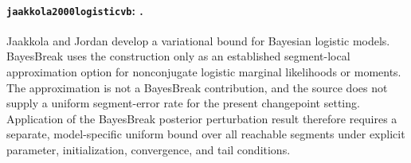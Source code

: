 \paragraph{\texttt{jaakkola2000logisticvb}: \citet{jaakkola2000logisticvb}.}
Jaakkola and Jordan develop a variational bound for Bayesian logistic models. BayesBreak uses the construction only as an established segment-local approximation option for nonconjugate logistic marginal likelihoods or moments. The approximation is not a BayesBreak contribution, and the source does not supply a uniform segment-error rate for the present changepoint setting. Application of the BayesBreak posterior perturbation result therefore requires a separate, model-specific uniform bound over all reachable segments under explicit parameter, initialization, convergence, and tail conditions.
